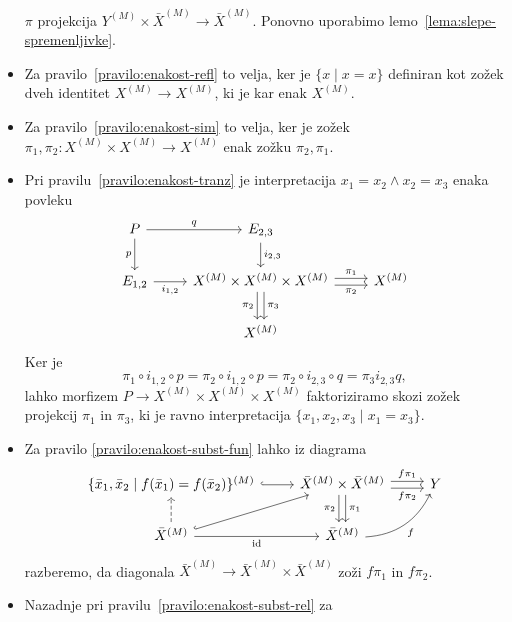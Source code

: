 \documentclass[../kategoricna_logika.tex]{subfiles}
\begin{document}
\begin{dokaz}
\begin{itemize}
    $\pi$ projekcija $Y^{(M)} \times \bar{X}^{(M)} \to \bar{X}^{(M)}$.
    Ponovno uporabimo lemo~\ref{lema:slepe-spremenljivke}.
  \item Za pravilo~\ref{pravilo:enakost-refl} to velja, ker je
    $\{x \mid x = x\}$ definiran kot zožek dveh identitet
    $X^{(M)} \to X^{(M)}$, ki je kar enak $X^{(M)}$.
  \item Za pravilo~\ref{pravilo:enakost-sim} to velja, ker je zožek
    $\pi_1, \pi_2 : X^{(M)} \times X^{(M)} \to X^{(M)}$ enak zožku
    $\pi_2, \pi_1$.
  \item Pri pravilu~\ref{pravilo:enakost-tranz} je interpretacija
    $x_1 = x_2 \land x_2 = x_3$ enaka povleku
    \begin{equation*}
      \begin{tikzcd}
        P \ar[d, "p"'] \ar[r, "q"] & E_{2,3} \ar[d, "i_{2,3}"] \\
        E_{1,2} \ar[r, "i_{1,2}"'] & X^{(M)} \times X^{(M)} \times
        X^{(M)} \ar[d, shift left, "\pi_3"] \ar[d, shift right,
        "\pi_2"'] \ar[r, shift left, "\pi_1"]
        \ar[r, shift right, "\pi_2"'] & X^{(M)} \\
        & X^{(M)}
      \end{tikzcd}
    \end{equation*}
    Ker je
    \[ \pi_1 \circ i_{1,2} \circ p = \pi_2 \circ i_{1,2} \circ p =
      \pi_2 \circ i_{2,3} \circ q = \pi_3i_{2,3}q,\]
    lahko morfizem
    $P \to X^{(M)} \times X^{(M)} \times X^{(M)}$ faktoriziramo skozi
    zožek projekcij $\pi_1$ in $\pi_3$, ki je ravno interpretacija
    $\{x_1, x_2, x_3 \mid x_1 = x_3\}$.
  \item Za pravilo \ref{pravilo:enakost-subst-fun} lahko iz diagrama
    \begin{equation*}
      \begin{tikzcd}
        \{\bar{x}_1, \bar{x}_2 \mid f(\bar{x}_1) =
        f(\bar{x}_2)\}^{(M)} \ar[r, hook] & \bar{X}^{(M)} \times
        \bar{X}^{(M)} \ar[r, shift left, "f \pi_1"] \ar[r, shift
        right, "f \pi_2"']
        \ar[d, shift left, "\pi_1"] \ar[d, shift right, "\pi_2"'] & Y \\
        \bar{X}^{(M)} \ar[u, dashed] \ar[ur, hook] \ar[r, "
        \mathrm{id}"'] & \bar{X}^{(M)} \ar[ur, bend right, "f"']
      \end{tikzcd}
    \end{equation*}
    razberemo, da diagonala
    $\bar{X}^{(M)} \to \bar{X}^{(M)} \times \bar{X}^{(M)}$ zoži
    $f \pi_1$ in $f \pi_2$.
  \item Nazadnje pri pravilu~\ref{pravilo:enakost-subst-rel} za

\end{itemize}
\end{dokaz}
\end{document}
